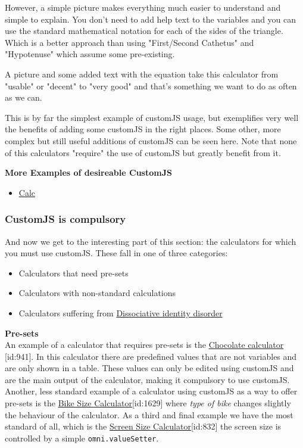 However, a simple picture makes everything much easier to understand and simple to explain. You don't need to add help text to the variables and you can use the standard mathematical notation for each of the sides of the triangle. Which is a better approach than using "First/Second Cathetus" and "Hypotenuse" which assume some pre-existing. 

A picture and some added text with the equation take this calculator from "usable" or "decent" to "very good" and that's something we want to do as often as we can. 

This is by far the simplest example of customJS usage, but exemplifies very well the benefits of adding some customJS in the right places.  Some other, more complex but still useful additions of customJS can be seen here. Note that none of this calculators "require" the use of customJS but greatly benefit from it.

\textbf{More Examples of desireable CustomJS}
\begin{itemize}
    \item \href{url}{Calc}
\end{itemize}

\subsubsection{CustomJS is compulsory}
\label{subsub:compulsory}

And now we get to the interesting part of this section: the calculators for which you must use customJS. These fall in one of three categories:
\begin{itemize}
    \item Calculators that need pre-sets
    \item Calculators with non-standard calculations
    \item Calculators suffering from \href{https://en.wikipedia.org/wiki/Dissociative_identity_disorder}{Dissociative identity disorder}
\end{itemize}

\textbf{Pre-sets}\\
\label{calc:preset}
An example of a calculator that requires pre-sets is the \href{https://www.omnicalculator.com/food/chocolate}{Chocolate calculator} [id:941]. In this calculator there are predefined values that are not variables and are only shown in a table. These values can only be edited using customJS and are the main output of the calculator, making it compulsory to use customJS. Another, less standard example of a calculator using customJS as a way to offer pre-sets is the \href{https://www.omnicalculator.com/all/bike-size}{Bike Size Calculator}[id:1629] where \textit{type of bike} changes slightly the behaviour of the calculator. As a third and final example we have the most standard of all, which is the \href{https://www.omnicalculator.com/all/screen-size}{Screen Size Calculator}[id:832] the screen size is controlled by a simple \texttt{omni.valueSetter}. 


